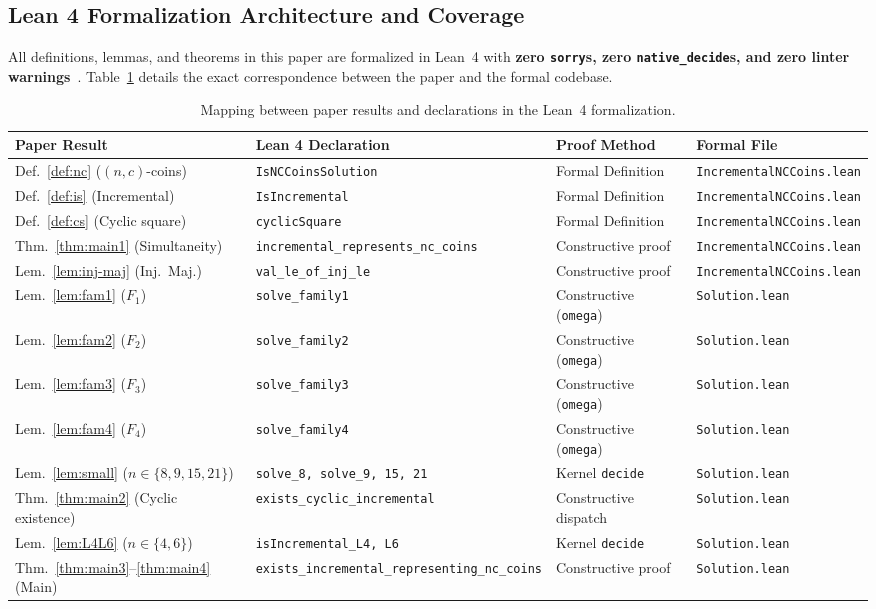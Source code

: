 \documentclass[10pt,a4paper]{article}
\theoremstyle{remark}
\begin{document}
\subsection{Lean 4 Formalization Architecture and Coverage}\label{sec:formalization}

All definitions, lemmas, and theorems in this paper are formalized in Lean~4 with
\textbf{zero \texttt{sorry}s, zero \texttt{native\_decide}s, and zero linter warnings}~\cite{PalomarLean,CompanionRepo}.
Table~\ref{tab:lean-coverage} details the exact correspondence between the paper and the formal codebase.

\begin{table}[htbp]
\centering
\scriptsize
\begin{tabular}{@{}llll@{}}
\toprule
Paper Result & Lean 4 Declaration & Proof Method & Formal File \\
\midrule
Def.~\ref{def:nc} ($(n,c)$-coins) & \texttt{IsNCCoinsSolution} & Formal Definition & \texttt{IncrementalNCCoins.lean} \\
Def.~\ref{def:is} (Incremental) & \texttt{IsIncremental} & Formal Definition & \texttt{IncrementalNCCoins.lean} \\
Def.~\ref{def:cs} (Cyclic square) & \texttt{cyclicSquare} & Formal Definition & \texttt{IncrementalNCCoins.lean} \\
Thm.~\ref{thm:main1} (Simultaneity) & \texttt{incremental\_represents\_nc\_coins} & Constructive proof & \texttt{IncrementalNCCoins.lean} \\
Lem.~\ref{lem:inj-maj} (Inj.\ Maj.) & \texttt{val\_le\_of\_inj\_le} & Constructive proof & \texttt{IncrementalNCCoins.lean} \\
Lem.~\ref{lem:fam1} ($F_1$) & \texttt{solve\_family1} & Constructive (\texttt{omega}) & \texttt{Solution.lean} \\
Lem.~\ref{lem:fam2} ($F_2$) & \texttt{solve\_family2} & Constructive (\texttt{omega}) & \texttt{Solution.lean} \\
Lem.~\ref{lem:fam3} ($F_3$) & \texttt{solve\_family3} & Constructive (\texttt{omega}) & \texttt{Solution.lean} \\
Lem.~\ref{lem:fam4} ($F_4$) & \texttt{solve\_family4} & Constructive (\texttt{omega}) & \texttt{Solution.lean} \\
Lem.~\ref{lem:small} ($n \in \{8,9,15,21\}$) & \texttt{solve\_8, solve\_9, 15, 21} & Kernel \texttt{decide} & \texttt{Solution.lean} \\
Thm.~\ref{thm:main2} (Cyclic existence) & \texttt{exists\_cyclic\_incremental} & Constructive dispatch & \texttt{Solution.lean} \\
Lem.~\ref{lem:L4L6} ($n \in \{4,6\}$) & \texttt{isIncremental\_L4, L6} & Kernel \texttt{decide} & \texttt{Solution.lean} \\
Thm.~\ref{thm:main3}--\ref{thm:main4} (Main) & \texttt{exists\_incremental\_representing\_nc\_coins} & Constructive proof & \texttt{Solution.lean} \\
\bottomrule
\end{tabular}
\caption{Mapping between paper results and declarations in the Lean~4 formalization.}
\label{tab:lean-coverage}
\end{table}
\end{document}
